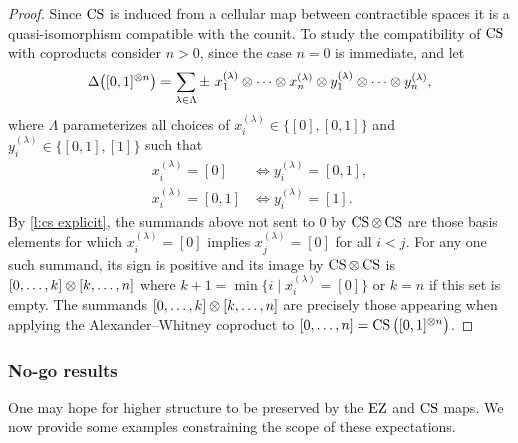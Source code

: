 \begin{proof}
	Since $\operatorname{CS}$ is induced from a cellular map between contractible spaces it is a quasi-isomorphism compatible with the counit.
	To study the compatibility of $\operatorname{CS}$ with coproducts consider $n > 0$, since the case $n = 0$ is immediate, and let
	\[
	\Delta \big( [0,1]^{\otimes n} \big) = \sum_{\lambda \in \Lambda} \pm \ x_1^{(\lambda)} \otimes \cdots \otimes x_n^{(\lambda)} \otimes y_1^{(\lambda)} \otimes \cdots \otimes y_n^{(\lambda)},
	\]
	where $\Lambda$ parameterizes all choices of $x_i^{(\lambda)} \in \{[0], [0,1]\}$ and $y_i^{(\lambda)} \in \{[0,1], [1]\}$ such that
	\begin{align*}
		x_i^{(\lambda)} = [0]   & \iff y_i^{(\lambda)} = [0,1], \\
		x_i^{(\lambda)} = [0,1] & \iff y_i^{(\lambda)} = [1].
	\end{align*}
	By \cref{l:cs explicit}, the summands above not sent to $0$ by $\operatorname{CS} \otimes \operatorname{CS}$ are those basis elements for which $x_i^{(\lambda)} = [0]$ implies $x_j^{(\lambda)} = [0]$ for all $i < j$.
	For any one such summand, its sign is positive and its image by $\operatorname{CS} \otimes \operatorname{CS}$ is $[0, \dots, k] \otimes [k, \dots, n]$ where $k+1 = \min \{i \mid x_i^{(\lambda)} = [0]\}$ or $k = n$ if this set is empty.
	The summands $[0, \dots, k] \otimes [k, \dots, n]$ are precisely those appearing when applying the Alexander--Whitney coproduct to $[0, \dots, n] = \operatorname{CS} \big( [0,1]^{\otimes n} \big)$.
\end{proof}

\subsubsection{No-go results}

One may hope for higher structure to be preserved by the $\operatorname{EZ}$ and $\operatorname{CS}$ maps.
We now provide some examples constraining the scope of these expectations.

